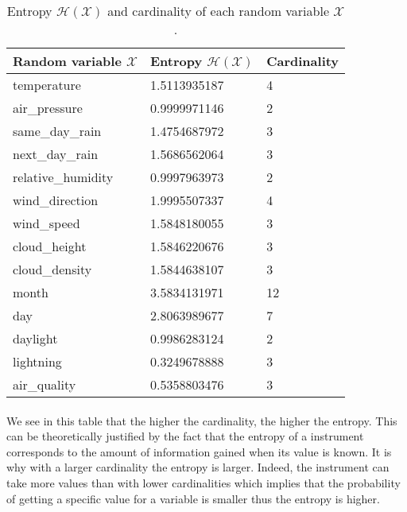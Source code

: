 \documentclass[a4paper, 11pt, oneside]{article}
\begin{document}
\begin{table}[H]
    \centering
    \begin{tabular}{|l|l|l|}
    \hline
    \textbf{Random variable $\mathcal{X}$} & \textbf{Entropy $\mathcal{H}(\mathcal{X})$} & \textbf{Cardinality} \\ \hline
    temperature            & 1.5113935187            & 4                    \\ \hline
    air\_pressure          & 0.9999971146             & 2                    \\ \hline
    same\_day\_rain        & 1.4754687972            & 3                    \\ \hline
    next\_day\_rain        & 1.5686562064            & 3                    \\ \hline
    relative\_humidity     & 0.9997963973            & 2                    \\ \hline
    wind\_direction        & 1.9995507337            & 4                    \\ \hline
    wind\_speed            & 1.5848180055            & 3                    \\ \hline
    cloud\_height          & 1.5846220676            & 3                    \\ \hline
    cloud\_density         & 1.5844638107            & 3                    \\ \hline
    month                  & 3.5834131971            & 12                   \\ \hline
    day                    & 2.8063989677            & 7                    \\ \hline
    daylight               & 0.9986283124            & 2                    \\ \hline
    lightning              & 0.3249678888            & 3                    \\ \hline
    air\_quality           & 0.5358803476            & 3                    \\ \hline
    \end{tabular}
    \caption{Entropy $\mathcal{H}(\mathcal{X})$ and cardinality of each random variable $\mathcal{X}$.}
    \label{table:q6}
    \end{table}

\paragraph{}We see in this table that the higher the cardinality, the higher the entropy. This can be theoretically justified by the fact that the 
entropy of a instrument corresponds to the amount of information gained when its value is known. It is why with a larger cardinality the entropy is larger. Indeed,
the instrument can take more values than with lower cardinalities which implies that the probability of getting a specific value for a variable is smaller thus the entropy is higher.
\end{document}
